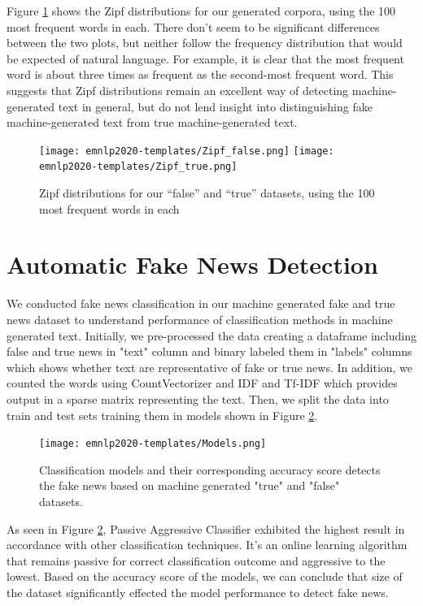 \documentclass[11pt,a4paper]{article}
\begin{document}
Figure \ref{fig:Zipf} shows the Zipf distributions for our generated corpora, using the 100 most frequent words in each. There don't seem to be significant differences between the two plots, but neither follow the frequency distribution that would be expected of natural language. For example, it is clear that the most frequent word is about three times as frequent as the second-most frequent word. This suggests that Zipf distributions remain an excellent way of detecting machine-generated text in general, but do not lend insight into distinguishing fake machine-generated text from true machine-generated text.

\begin{figure}
    \centering
    \texttt{[image: emnlp2020-templates/Zipf\_false.png]}
    \texttt{[image: emnlp2020-templates/Zipf\_true.png]}
    \caption{Zipf distributions for our ``false'' and ``true'' datasets, using the 100 most frequent words in each}
    \label{fig:Zipf}
\end{figure}

\section{Automatic Fake News Detection}
We conducted fake news classification in our machine generated fake and true news dataset to understand performance of classification methods in machine generated text. Initially, we pre-processed the data creating a dataframe including false and true news in "text" column and binary labeled them in "labels" columns which shows whether text are representative of fake or true news. In addition, we counted the words using CountVectorizer and IDF and Tf-IDF which provides output in a sparse matrix representing the text. Then, we split the data into train and test sets training them in models shown in Figure \ref{fig:Models}.

\begin{figure}
    \centering
    \texttt{[image: emnlp2020-templates/Models.png]}
    \caption{Classification models and their corresponding accuracy score detects the fake news based on machine generated "true" and "false" datasets.}
    \label{fig:Models}
\end{figure}

As seen in Figure \ref{fig:Models}, Passive Aggressive Classifier exhibited the highest result in accordance with other classification techniques. It's an online learning algorithm that remains passive for correct classification outcome and aggressive to the lowest. Based on the accuracy score of the models, we can conclude that size of the dataset significantly effected the model performance to detect fake news. 
\end{document}
